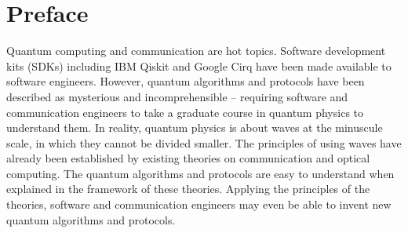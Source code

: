 \chapter*{Preface}
Quantum computing and communication are hot topics. Software development kits (SDKs) including IBM Qiskit and Google Cirq have been made available to software engineers. However, quantum algorithms and protocols have been described as mysterious and incomprehensible -- requiring software and communication engineers to take a graduate course in quantum physics to understand them. In reality, quantum physics is about waves at the minuscule scale, in which they cannot be divided smaller. The principles of using waves have already been established by existing theories on communication and optical computing. The quantum algorithms and protocols are easy to understand when explained in the framework of these theories. Applying the principles of the theories, software and communication engineers may even be able to invent new quantum algorithms and protocols.
